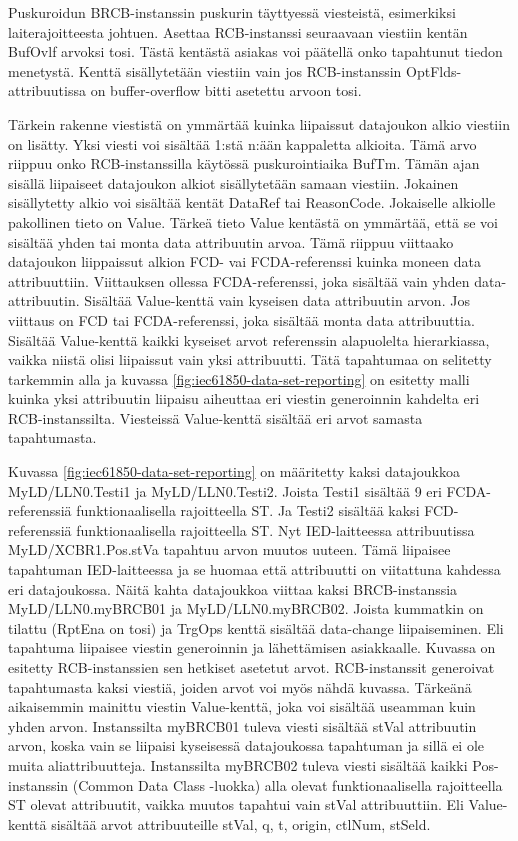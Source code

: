 Puskuroidun BRCB-instanssin puskurin täyttyessä viesteistä, esimerkiksi laiterajoitteesta johtuen. Asettaa RCB-instanssi seuraavaan viestiin kentän BufOvlf arvoksi tosi. Tästä kentästä asiakas voi päätellä onko tapahtunut tiedon menetystä. Kenttä sisällytetään viestiin vain jos RCB-instanssin OptFlds-attribuutissa on buffer-overflow bitti asetettu arvoon tosi. \cite[s.~106--107]{IEC61850-7-2}

Tärkein rakenne viestistä on ymmärtää kuinka liipaissut datajoukon alkio viestiin on lisätty. Yksi viesti voi sisältää 1:stä n:ään kappaletta alkioita. Tämä arvo riippuu onko RCB-instanssilla käytössä puskurointiaika BufTm. Tämän ajan sisällä liipaiseet datajoukon alkiot sisällytetään samaan viestiin. Jokainen sisällytetty alkio voi sisältää kentät DataRef tai ReasonCode. Jokaiselle alkiolle pakollinen tieto on Value. Tärkeä tieto Value kentästä on ymmärtää, että se voi sisältää yhden tai monta data attribuutin arvoa. Tämä riippuu viittaako datajoukon liippaissut alkion FCD- vai FCDA-referenssi kuinka moneen data attribuuttiin. Viittauksen ollessa FCDA-referenssi, joka sisältää vain yhden data-attribuutin. Sisältää Value-kenttä vain kyseisen data attribuutin arvon. Jos viittaus on FCD tai FCDA-referenssi, joka sisältää monta data attribuuttia. Sisältää Value-kenttä kaikki kyseiset arvot referenssin alapuolelta hierarkiassa, vaikka niistä olisi liipaissut vain yksi attribuutti. Tätä tapahtumaa on selitetty tarkemmin alla ja kuvassa \ref{fig:iec61850-data-set-reporting} on esitetty malli kuinka yksi attribuutin liipaisu aiheuttaa eri viestin generoinnin kahdelta eri RCB-instanssilta. Viesteissä Value-kenttä sisältää eri arvot samasta tapahtumasta. \cite[s.~107--108]{IEC61850-7-1}

Kuvassa \ref{fig:iec61850-data-set-reporting} on määritetty kaksi datajoukkoa MyLD/LLN0.Testi1 ja MyLD/LLN0.Testi2. Joista Testi1 sisältää 9 eri FCDA-referenssiä funktionaalisella rajoitteella ST. Ja Testi2 sisältää kaksi FCD-referenssiä funktionaalisella rajoitteella ST. Nyt IED-laitteessa attribuutissa MyLD/XCBR1.Pos.stVa tapahtuu arvon muutos uuteen. Tämä liipaisee tapahtuman IED-laitteessa ja se huomaa että attribuutti on viitattuna kahdessa eri datajoukossa. Näitä kahta datajoukkoa viittaa kaksi BRCB-instanssia MyLD/LLN0.myBRCB01 ja MyLD/LLN0.myBRCB02. Joista kummatkin on tilattu (RptEna on tosi) ja TrgOps kenttä sisältää data-change liipaiseminen. Eli tapahtuma liipaisee viestin generoinnin ja lähettämisen asiakkaalle. Kuvassa on esitetty RCB-instanssien sen hetkiset asetetut arvot. RCB-instanssit generoivat tapahtumasta kaksi viestiä, joiden arvot voi myös nähdä kuvassa. Tärkeänä aikaisemmin mainittu viestin Value-kenttä, joka voi sisältää useamman kuin yhden arvon. Instanssilta myBRCB01 tuleva viesti sisältää stVal attribuutin arvon, koska vain se liipaisi kyseisessä datajoukossa tapahtuman ja sillä ei ole muita aliattribuutteja. Instanssilta myBRCB02 tuleva viesti sisältää kaikki Pos-instanssin (Common Data Class -luokka) alla olevat funktionaalisella rajoitteella ST olevat attribuutit, vaikka muutos tapahtui vain stVal attribuuttiin. Eli Value-kenttä sisältää arvot attribuuteille stVal, q, t, origin, ctlNum, stSeld. \cite[s.~108]{IEC61850-7-2} \cite[s.~40--44]{IEC61850-7-1}

